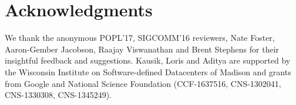 \section*{Acknowledgments}
We thank the anonymous POPL'17, SIGCOMM'16 reviewers,
Nate Foster, Aaron-Gember Jacobson, 
Raajay Viswanathan and Brent Stephens 
for their insightful feedback and suggestions. 
Kausik, Loris and Aditya  
are supported by the Wisconsin Institute
on Software-defined Datacenters of Madison and 
grants from Google and National
Science Foundation (CCF-1637516, CNS-1302041, CNS-1330308, CNS-1345249).